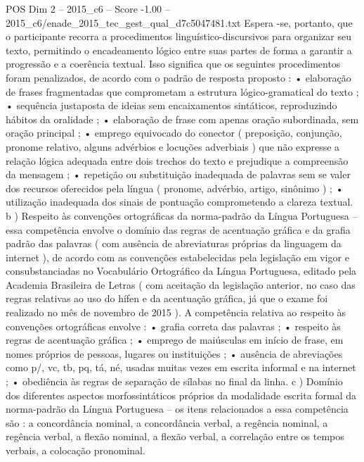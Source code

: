 \begin{textsample}{POS Dim 2 – 2015\_c6 – Score -1.00 – 2015\_c6/enade\_2015\_tec\_gest\_qual\_d7c5047481.txt}
Espera -se, portanto, que o participante recorra a procedimentos linguístico-discursivos para organizar seu texto, permitindo o encadeamento lógico entre suas partes de forma a garantir a progressão e a coerência textual.
Isso significa que os seguintes procedimentos foram penalizados, de acordo com o padrão de resposta proposto : • elaboração de frases fragmentadas que comprometam a estrutura lógico-gramatical do texto ; • sequência justaposta de ideias sem encaixamentos sintáticos, reproduzindo hábitos da oralidade ; • elaboração de frase com apenas oração subordinada, sem oração principal ; • emprego equivocado do conector ( preposição, conjunção, pronome relativo, alguns advérbios e locuções adverbiais ) que não expresse a relação lógica adequada entre dois trechos do texto e prejudique a compreensão da mensagem ; • repetição ou substituição inadequada de palavras sem se valer dos recursos oferecidos pela língua ( pronome, advérbio, artigo, sinônimo ) ; • utilização inadequada dos sinais de pontuação comprometendo a clareza textual. b ) Respeito às convenções ortográficas da norma-padrão da Língua Portuguesa – essa competência envolve o domínio das regras de acentuação gráfica e da grafia padrão das palavras ( com ausência de abreviaturas próprias da linguagem da internet ), de acordo com as convenções estabelecidas pela legislação em vigor e consubstanciadas no Vocabulário Ortográfico da Língua Portuguesa, editado pela Academia Brasileira de Letras ( com aceitação da legislação anterior, no caso das regras relativas ao uso do hífen e da acentuação gráfica, já que o exame foi realizado no mês de novembro de 2015 ).
A competência relativa ao respeito às convenções ortográficas envolve : • grafia correta das palavras ; • respeito às regras de acentuação gráfica ; • emprego de maiúsculas em início de frase, em nomes próprios de pessoas, lugares ou instituições ; • ausência de abreviações como p/, vc, tb, pq, tá, né, usadas muitas vezes em escrita informal e na internet ; • obediência às regras de separação de sílabas no final da linha. c ) Domínio dos diferentes aspectos morfossintáticos próprios da modalidade escrita formal da norma-padrão da Língua Portuguesa – os itens relacionados a essa competência são : a concordância nominal, a concordância verbal, a regência nominal, a regência verbal, a flexão nominal, a flexão verbal, a correlação entre os tempos verbais, a colocação pronominal.

\end{textsample}

